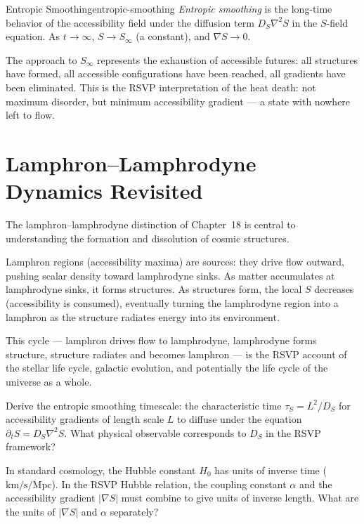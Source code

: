 \begin{definition}{Entropic Smoothing}{entropic-smoothing}
  \emph{Entropic smoothing} is the long-time behavior of the accessibility
  field under the diffusion term $D_S \nabla^2 S$ in the $S$-field equation.
  As $t \to \infty$, $S \to S_\infty$ (a constant), and $\nabla S \to 0$.
\end{definition}

The approach to $S_\infty$ represents the exhaustion of accessible futures:
all structures have formed, all accessible configurations have been reached,
all gradients have been eliminated. This is the RSVP interpretation of
the heat death: not maximum disorder, but minimum accessibility gradient —
a state with nowhere left to flow.

\section{Lamphron–Lamphrodyne Dynamics Revisited}

The lamphron–lamphrodyne distinction of Chapter~18 is central to
understanding the formation and dissolution of cosmic structures.

Lamphron regions (accessibility maxima) are sources: they drive flow
outward, pushing scalar density toward lamphrodyne sinks. As matter
accumulates at lamphrodyne sinks, it forms structures. As structures
form, the local $S$ decreases (accessibility is consumed), eventually
turning the lamphrodyne region into a lamphron as the structure radiates
energy into its environment.

This cycle — lamphron drives flow to lamphrodyne, lamphrodyne forms
structure, structure radiates and becomes lamphron — is the RSVP
account of the stellar life cycle, galactic evolution, and potentially
the life cycle of the universe as a whole.

\begin{exercise}
  Derive the entropic smoothing timescale: the characteristic time
  $\tau_S = L^2 / D_S$ for accessibility gradients of length scale $L$
  to diffuse under the equation $\partial_t S = D_S \nabla^2 S$.
  What physical observable corresponds to $D_S$ in the RSVP framework?
\end{exercise}

\begin{exercise}
  In standard cosmology, the Hubble constant $H_0$ has units of inverse
  time ($\text{km/s/Mpc}$). In the RSVP Hubble relation, the coupling
  constant $\alpha$ and the accessibility gradient $|\nabla S|$ must
  combine to give units of inverse length. What are the units of
  $|\nabla S|$ and $\alpha$ separately?
\end{exercise}
